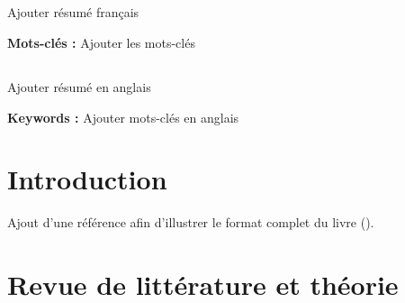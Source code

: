 \documentclass[
  12pt,
  letterpaper,
]{report}
\renewcommand*\contentsname{Table des matières}
\newcommand\contentsname{Table des matières}
\begin{document}
\section*{}
\begin{spacing}{1}

Ajouter résumé français

\end{spacing}
\vspace{1cm}

\noindent \textbf{Mots-clés :} Ajouter les mots-clés \clearpage

\section*{}

\begin{spacing}{1}

Ajouter résumé en anglais

\end{spacing}
\vspace{1cm}

\noindent \textbf{Keywords :} Ajouter mots-clés en anglais \clearpage

\renewcommand*\contentsname{Table des matières}
{
\hypersetup{linkcolor=}
\setcounter{tocdepth}{3}
\tableofcontents
}
\listoffigures
\listoftables


\chapter{}\label{section}


\chapter{Introduction}\label{introduction}

Ajout d'une référence afin d'illustrer le format complet du livre
().


\chapter{Revue de littérature et
théorie}\label{revue-de-littuxe9rature-et-thuxe9orie}

\end{document}
